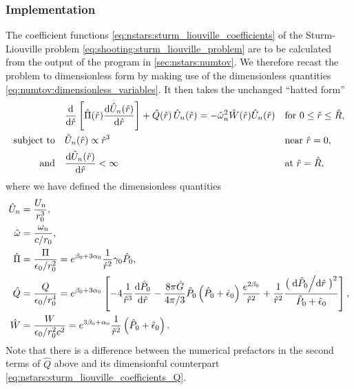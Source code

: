 \subsubsection{Implementation}

The coefficient functions \eqref{eq:nstars:sturm_liouville_coefficients} of the Sturm-Liouville problem \eqref{eq:shooting:sturm_liouville_problem} are to be calculated from the output of the program in \cref{sec:nstars:numtov}.
We therefore recast the problem to dimensionless form by making use of the dimensionless quantities \eqref{eq:numtov:dimensionless_variables}.
It then takes the unchanged ``hatted form''
\begin{subequations}
\begin{align}
	&\odv*{ \left[ \hat{\Pi}(\hat{r}) \odv{\hat{U}_n(\hat{r})}{\hat{r}} \right] }{\hat{r}} + \hat{Q}(\hat{r}) \, \hat{U}_n(\hat{r}) = -\hat{\omega}_n^2 \hat{W}(\hat{r}) \hat{U}_n(\hat{r}) && \text{for } 0 \leq \hat{r} \leq \hat{R} , \label{eq:shooting:sturm_liouville_diffeq_dimless} \\
	\text{subject to} \quad & \hat{U}_n(\hat{r})          \propto \hat{r}^3    && \text{near } \hat{r}=0 , \label{eq:shooting:sturm_liouville_bc1_dimless} \\
	\text{and}        \quad & \odv{\hat{U}_n(\hat{r})}{\hat{r}} <       \infty && \text{at } \hat{r}=\hat{R} \label{eq:shooting:sturm_liouville_bc2_dimless} ,
\end{align}%
\label{eq:shooting:sturm_liouville_problem_dimless}%
\end{subequations}%
where we have defined the dimensionless quantities
\begin{subequations}
\begin{align}
	\hat{U}_n    &= \frac{U_n}{r_0^3} , \\ 
	\hat{\omega} &= \frac{\omega_n}{c/r_0} , \\ 
	\hat{\Pi}    &= \frac{\Pi}{\epsilon_0 / r_0^2}   = e^{\beta_0 + 3 \alpha_0} \frac{1}{\hat{r}^2} \gamma_0 \hat{P}_0 , \\
	\hat{Q}      &= \frac{Q}{\epsilon_0 / r_0^4}     = e^{\beta_0 + 3 \alpha_0} \left[ -4 \frac{1}{\hat{r}^3} \odv{\hat{P}_0}{\hat{r}} - \frac{8 \pi \hat{G}}{4 \pi / 3} \hat{P}_0 \left( \hat{P}_0 + \hat{\epsilon}_0 \right) \frac{e^{2 \beta_0}}{\hat{r}^2} + \frac{1}{\hat{r}^2} \frac{\big( \odv{\hat{P}_0}/{\hat{r}} \big)^2}{\hat{P}_0 + \hat{\epsilon}_0} \right] , \\
	\hat{W}      &= \frac{W}{\epsilon_0 / r_0^2 c^2} = e^{3 \beta_0 + \alpha_0} \frac{1}{\hat{r}^2} \left( \hat{P}_0 + \hat{\epsilon}_0 \right) .
\end{align}%
\label{eq:shooting:dimensionless_variables}%
\end{subequations}%
Note that there is a difference between the numerical prefactors in the second terms of $\hat{Q}$ above and its dimensionful counterpart \eqref{eq:nstars:sturm_liouville_coefficients_Q}.

